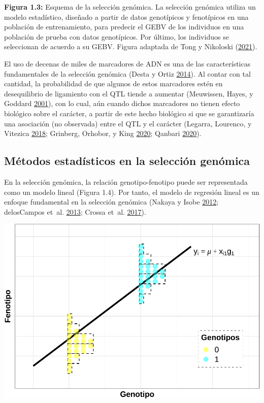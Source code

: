 \documentclass[11pt,spanish,a4paper,oneside,]{book} %
\begin{document}
\begin{center}
\textbf{Figura 1.3:} Esquema de la selección genómica. La selección genómica utiliza un modelo estadístico, diseñado a partir de datos genotípicos y fenotípicos en una población de entrenamiento, para predecir el GEBV de los individuos en una población de prueba con datos genotípicos. Por último, los individuos se seleccionan de acuerdo a su GEBV. Figura adaptada de Tong y Nikoloski (\protect\hyperlink{ref-cite:7}{2021}).

\end{center}

El uso de decenas de miles de marcadores de ADN es una de las características fundamentales de la selección genómica (Desta y Ortiz \protect\hyperlink{ref-cite:10}{2014}). Al contar con tal cantidad, la probabilidad de que algunos de estos marcadores estén en desequilibrio de ligamiento con el QTL tiende a aumentar (Meuwissen, Hayes, y Goddard \protect\hyperlink{ref-cite:8}{2001}), con lo cual, aún cuando dichos marcadores no tienen efecto biológico sobre el carácter, a partir de este hecho biológico si que se garantizaría una asociación (no observada) entre el QTL y el carácter (Legarra, Lourenco, y Vitezica \protect\hyperlink{ref-cite:30}{2018}; Grinberg, Orhobor, y King \protect\hyperlink{ref-cite:35}{2020}; Qanbari \protect\hyperlink{ref-cite:36}{2020}).

\hypertarget{muxe9todos-estaduxedsticos-en-la-selecciuxf3n-genuxf3mica}{%
\subsection{Métodos estadísticos en la selección genómica}\label{muxe9todos-estaduxedsticos-en-la-selecciuxf3n-genuxf3mica}}

En la selección genómica, la relación genotipo-fenotipo puede ser representada como un modelo lineal (Figura 1.4). Por tanto, el modelo de regresión lineal es un enfoque fundamental en la selección genómica (Nakaya y Isobe \protect\hyperlink{ref-cite:6}{2012}; delosCampos et~al. \protect\hyperlink{ref-cite:31}{2013}; Crossa et~al. \protect\hyperlink{ref-cite:37}{2017}).

\begin{center}\includegraphics[width=1\linewidth]{figures/Mod_RL} \end{center}
\end{document}
